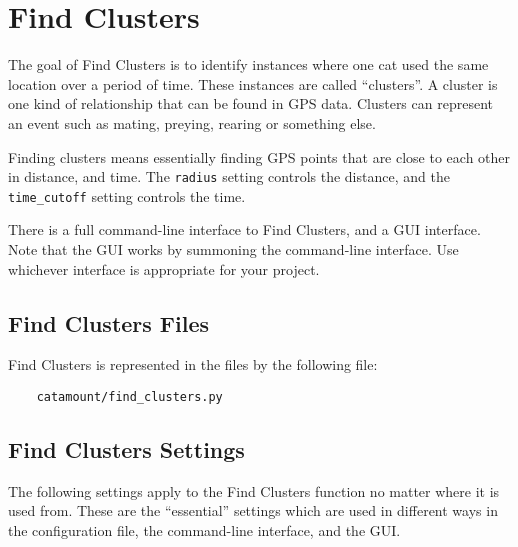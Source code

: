 \chapter{Find Clusters}
\hypertarget{find-clusters}{}

The goal of Find Clusters is to identify instances where one cat used
the same location over a period of time. These instances are called
``clusters''. A cluster is one kind of relationship that can be found
in GPS data. Clusters can represent an event such as mating, preying,
rearing or something else.

Finding clusters means essentially finding GPS points that are close
to each other in distance, and time. The \texttt{radius} setting
controls the distance, and the \texttt{time\_cutoff} setting controls the
time.

There is a full command-line interface to Find Clusters, and a GUI
interface. Note that the GUI works by summoning the command-line
interface. Use whichever interface is appropriate for your project.

\section{Find Clusters Files}

Find Clusters is represented in the files by the following file:

\begin{verbatim}
    catamount/find_clusters.py
\end{verbatim}

\section{Find Clusters Settings}
\hypertarget{cluster-settings}{}

The following settings apply to the Find Clusters function no matter
where it is used from. These are the ``essential'' settings which are
used in different ways in the configuration file, the command-line
interface, and the GUI.

